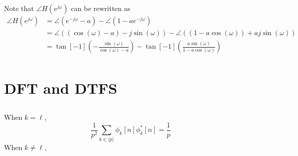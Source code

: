 \documentclass{article}
\begin{document}
\subsection{}

Note that \(\angle H(e^{j \omega})\) can be rewritten as
\begin{align}
    \angle H(e^{j \omega}) &= \angle(e^{-j \omega} - a) - \angle(1 - ae^{-j \omega}) \\
    &= \angle((\cos(\omega) - a) - j \sin(\omega)) - \angle ((1 - a \cos(\omega)) + a j \sin(\omega)) \\
    &= \tan[-1](-\frac{\sin(\omega)}{\cos(\omega) - a}) - \tan[-1](\frac{a \sin(\omega)}{1 - a \cos(\omega)}) \\
\end{align}

\section{DFT and DTFS}

\subsection{}

When \(k = \ell\),
\begin{equation}
    \frac{1}{p^2} \sum_{k \in \langle p \rangle} \phi_k[n] \phi_k^\ast[n] = \frac{1}{p}
\end{equation}
When \(k \neq \ell\),
\end{document}
